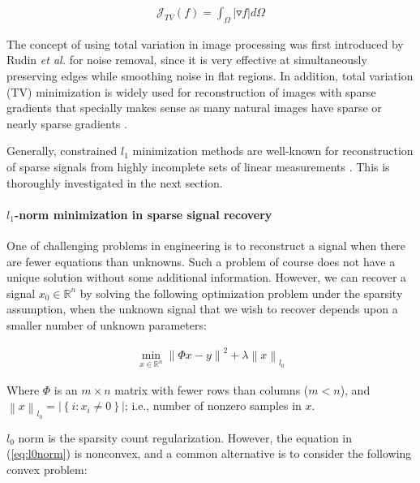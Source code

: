 \begin{equation}
\begin{gathered}
\mathcal{J}_{TV}(f) = \int_{\Omega} |\triangledown f| d\Omega
\end{gathered}
\end{equation}

The concept of using total variation in image processing was first introduced by Rudin \emph{et al.} \cite{rudin1992nonlinear} for noise removal, since it is very effective at simultaneously preserving edges while smoothing noise in flat regions. In addition, total variation (TV) minimization is widely used for reconstruction of images with sparse gradients that specially makes sense as many natural images have sparse or nearly sparse gradients \cite{blomgren1998color}.

Generally, constrained $l_{1}$ minimization methods are well-known for reconstruction of sparse signals from highly incomplete sets of linear measurements \cite{candes2008enhancing}. This is thoroughly investigated in the next section.

\paragraph{$l_{1}$-norm minimization in sparse signal recovery}

One of challenging problems in engineering is to reconstruct a signal when there are fewer equations than unknowns. Such a problem of course does not have a unique solution without some additional information. However, we can recover a signal $x_{0}\in \mathbb{R}^{n}$ by solving the following optimization problem under the sparsity assumption, when the unknown signal that we wish to recover depends upon a smaller number of unknown parameters:

\begin{equation}
\label{eq:l0norm}
\begin{gathered}
\min_{x\in \mathbb{R}^{n}}\left\|\Phi x-y\right\|^{2} + \lambda \left \|x  \right \|_{l_{0}}
\end{gathered}
\end{equation}

Where $\Phi$ is an $m \times n$ matrix with fewer rows than columns ($m<n$), and $\left \| x \right \|_{l_{0}}=\left | \left \{ i:x_{i} \neq 0 \right \} \right |$; i.e., number of nonzero samples in $x$.

$l_{0}$ norm is the sparsity count regularization. However, the equation in (\ref{eq:l0norm}) is nonconvex, and a common alternative is to consider the following convex problem:

